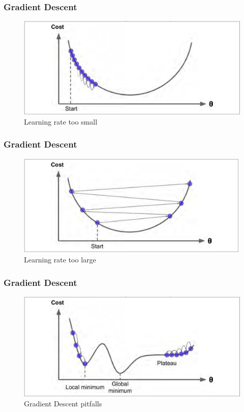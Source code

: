 \documentclass[11pt]{beamer}
\begin{document}
\begin{frame}
	\frametitle{Gradient Descent}
	\begin{figure}
	\centering
	\includegraphics[scale=0.35]{figure4-4}
\caption{Learning rate too small}
	\end{figure}		
\end{frame}

\begin{frame}
	\frametitle{Gradient Descent}
	\begin{figure}
		\centering
		\includegraphics[scale=0.35]{figure4-5}
		\caption{Learning rate too large}
	\end{figure}		
\end{frame}


\begin{frame}
	\frametitle{Gradient Descent}
	\begin{figure}
		\centering
		\includegraphics[scale=0.35]{figure4-6}
		\caption{Gradient Descent pitfalls}
	\end{figure}		
\end{frame}
\end{document}

